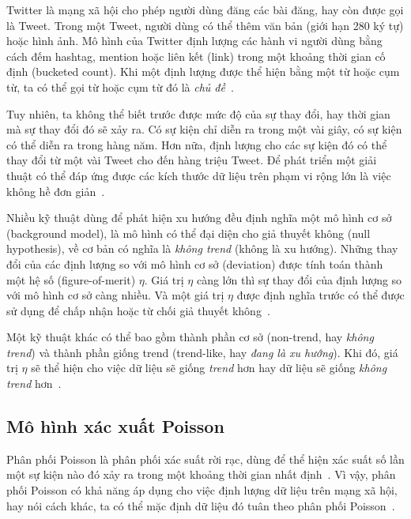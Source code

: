 Twitter là mạng xã hội cho phép người dùng đăng các bài đăng, hay còn được gọi
là Tweet. Trong một Tweet, người dùng có thể thêm văn bản (giới hạn 280 ký tự)
hoặc hình ảnh. Mô hình của Twitter định lượng các hành vi người dùng bằng cách
đếm hashtag, mention hoặc liên kết (link) trong một khoảng thời gian cố định
(bucketed count). Khi một định lượng được thể hiện bằng một từ hoặc cụm từ, ta
có thể gọi từ hoặc cụm từ đó là \textit{chủ
đề}~\cite{hendricksonTrendDetectionSocial2015}.

Tuy nhiên, ta không thể biết trước được mức độ của sự thay đổi, hay thời gian
mà sự thay đổi đó sẽ xảy ra. Có sự kiện chỉ diễn ra trong một vài giây, có sự
kiện có thể diễn ra trong hàng năm. Hơn nữa, định lượng cho các sự kiện đó có
thể thay đổi từ một vài Tweet cho đến hàng triệu Tweet. Để phát triển một giải
thuật có thể đáp ứng được các kích thước dữ liệu trên phạm vi rộng lớn là việc
không hề đơn giản~\cite{hendricksonTrendDetectionSocial2015}.

Nhiều kỹ thuật dùng để phát hiện xu hướng đều định nghĩa một mô hình cơ sở
(background model), là mô hình có thể đại diện cho giả thuyết không (null
hypothesis), về cơ bản có nghĩa là \textit{không trend} (không là xu hướng).
Những thay đổi của các định lượng so với mô hình cơ sở (deviation) được tính
toán thành một hệ số (figure-of-merit) $\eta$. Giá trị $\eta$ càng lớn thì sự
thay đổi của định lượng so với mô hình cơ sở càng nhiều. Và một giá trị $\eta$
được định nghĩa trước có thể được sử dụng để chấp nhận hoặc từ chối giả thuyết
không~\cite{hendricksonTrendDetectionSocial2015}.

Một kỹ thuật khác có thể bao gồm thành phần cơ sở (non-trend, hay \textit{không
trend}) và thành phần giống trend (trend-like, hay \textit{đang là xu hướng}).
Khi đó, giá trị $\eta$ sẽ thể hiện cho việc dữ liệu sẽ giống \textit{trend} hơn
hay dữ liệu sẽ giống \textit{không trend}
hơn~\cite{hendricksonTrendDetectionSocial2015}.

\subsection{Mô hình xác xuất Poisson}

Phân phối Poisson là phân phối xác suất rời rạc, dùng để thể hiện xác suất số
lần một sự kiện nào đó xảy ra trong một khoảng thời gian nhất
định~\cite{haightHandbookPoissonDistribution1967}. Vì vậy, phân phối Poisson có
khả năng áp dụng cho việc định lượng dữ liệu trên mạng xã hội, hay nói cách
khác, ta có thể mặc định dữ liệu đó tuân theo phân phối
Poisson~\cite{hendricksonTrendDetectionSocial2015}.

